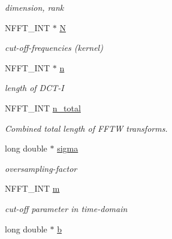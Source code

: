 \begin{DoxyCompactItemize}
\begin{DoxyCompactList}\small\item\em dimension, rank \end{DoxyCompactList}\item 
\hypertarget{structnfctl__plan_a911c69e5b97b1e772de64a3a7177849a}{N\-F\-F\-T\-\_\-\-I\-N\-T $\ast$ \hyperlink{structnfctl__plan_a911c69e5b97b1e772de64a3a7177849a}{N}}\label{structnfctl__plan_a911c69e5b97b1e772de64a3a7177849a}

\begin{DoxyCompactList}\small\item\em cut-\/off-\/frequencies (kernel) \end{DoxyCompactList}\item 
\hypertarget{structnfctl__plan_a38a7f3ad155f8bef9d7258c9edbad0bc}{N\-F\-F\-T\-\_\-\-I\-N\-T $\ast$ \hyperlink{structnfctl__plan_a38a7f3ad155f8bef9d7258c9edbad0bc}{n}}\label{structnfctl__plan_a38a7f3ad155f8bef9d7258c9edbad0bc}

\begin{DoxyCompactList}\small\item\em length of D\-C\-T-\/\-I \end{DoxyCompactList}\item 
N\-F\-F\-T\-\_\-\-I\-N\-T \hyperlink{structnfctl__plan_a7c2552cb7e53bc6dddf9fe9c8b8b529a}{n\-\_\-total}
\begin{DoxyCompactList}\small\item\em Combined total length of F\-F\-T\-W transforms. \end{DoxyCompactList}\item 
\hypertarget{structnfctl__plan_a629ae83677e311095d4c24ad4826e2ab}{long double $\ast$ \hyperlink{structnfctl__plan_a629ae83677e311095d4c24ad4826e2ab}{sigma}}\label{structnfctl__plan_a629ae83677e311095d4c24ad4826e2ab}

\begin{DoxyCompactList}\small\item\em oversampling-\/factor \end{DoxyCompactList}\item 
\hypertarget{structnfctl__plan_aa32ab7ed9e9e458e4e603a4517265c9c}{N\-F\-F\-T\-\_\-\-I\-N\-T \hyperlink{structnfctl__plan_aa32ab7ed9e9e458e4e603a4517265c9c}{m}}\label{structnfctl__plan_aa32ab7ed9e9e458e4e603a4517265c9c}

\begin{DoxyCompactList}\small\item\em cut-\/off parameter in time-\/domain \end{DoxyCompactList}\item 
\hypertarget{structnfctl__plan_a01287f3f68aff7e5d7ce35d3163021e2}{long double $\ast$ \hyperlink{structnfctl__plan_a01287f3f68aff7e5d7ce35d3163021e2}{b}}\label{structnfctl__plan_a01287f3f68aff7e5d7ce35d3163021e2}


\end{DoxyCompactItemize}
